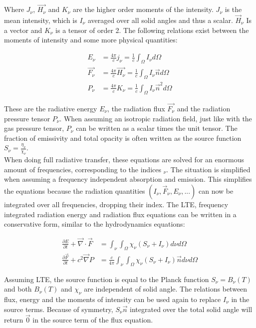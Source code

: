 Where $J_\nu$, $\vec{H_\nu}$ and $K_\nu$ are the higher order moments of the intensity. $J_\nu$ is the mean intensity, which is $I_\nu$ averaged over all solid angles and thus a scalar. $\vec{H}_\nu$ Is a vector and $K_\nu$ is a tensor of order 2. The following relations exist between the moments of intensity and some more physical quantities:

\begin{align}
E_\nu &= \frac{4 \pi}{c} j_\nu = \frac{1}{c} \int_\Omega I_\nu d \Omega\\
\vec{F_\nu} &= \frac{4 \pi}{c} \vec{H_\nu} = \frac{1}{c} \int_\Omega I_\nu \vec{n} d \Omega\\
P_\nu &= \frac{4 \pi}{c} K_\nu = \frac{1}{c} \int_\Omega I_\nu \vec{n}^2 d \Omega
\end{align}

These are the radiative energy $E_\nu$, the radiation flux $\vec{F_\nu}$ and the radiation pressure tensor $P_\nu$. When assuming an isotropic radiation field, just like with the gas pressure tensor, $P_\nu$ can be written as a scalar times the unit tensor. The fraction of emissivity and total opacity is often written as the source function $S_\nu = \frac{\eta_\nu}{\chi_\nu}$. \\
 When doing full radiative transfer, these equations are solved for an enormous amount of frequencies, corresponding to the indices $_\nu$. The situation is simplified when assuming a frequency independent absorption and emission. This simplifies the equations because the radiation quantities $(I_\nu, \vec{F}_\nu, E_\nu, ...)$ can now be integrated over all frequencies, dropping their index. The LTE, frequency integrated radiation energy and radiation flux equations can be written in a conservative form, similar to the hydrodynamics equations: 

\begin{align}
\frac{\partial E}{\partial t} + \vec{\nabla} \cdot \vec{F} &= \int_\nu \int_\Omega \chi_\nu \left( S_\nu + I_\nu \right) d\nu d\Omega \label{eq: E_si}\\
\frac{\partial \vec{F}}{\partial t} + c^2 \vec{\nabla} P &= \frac{c}{4 \pi} \int_\nu \int_\Omega \chi_\nu \left( S_\nu + I_\nu \right) \vec{n} d\nu d\Omega \label{F_si}
\end{align}

Assuming LTE, the source function is equal to the Planck function $S_\nu = B_\nu(T)$ and both $B_\nu(T)$ and $\chi_\nu$ are independent of solid angle. The relations between flux, energy and the moments of intensity can be used again to replace $I_\nu$ in the source terms. Because of symmetry, $S_\nu \vec{n}$ integrated over the total solid angle will return $\vec{0}$ in the source term of the flux equation.\\

